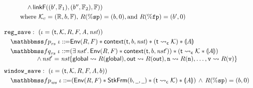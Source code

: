 \begin{figure}[!t]
\[\begin{array}{l}
\begin{array}{lcl}
                    & & \quad
                    \, \land \, 
                    \linkF((\block', \hWstk_1), (\block'', \hWstk_2), \hWstk)
                ) \\
                \\[-9pt]
                \multicolumn{3}{l}
                {
                    \qquad 
                    \text{where} \ 
                    \hthrdlocalst_c = (\hRfile, \block, \hWstk), \, 
                    \RFile(\spreg) = (\block, 0), \text{and } 
                    \RFile(\fpreg) = (\block', 0)
                }
            \end{array} 
            \\
            \\
            \texttt{reg\_save}: \ (\lgvl = (\thrdid, \hthrdlocalst, \RFile, \Wstack, 
            \primcom, \nst)) \\
            \\[-9pt]
            \quad 
            \relspecpre_{\textit{rs}} \ \lgvl \define 
            \Env{\RFile, \Wstack} \sepstar 
            \context{\thrdid, \block, \nst} \sepstar 
            (\astCurCont{\thrdid}{\hthrdlocalst}) \sepstar \safePrimAst{\primcom} \\
            \\[-9pt]
            \quad
            \relspecpost_{\textit{rs}} \ \lgvl \define 
            (\exists \, \nst'. \, \Env{\RFile, \Wstack} \sepstar
            \relcontext{\thrdid}{\block}{\nst'}) \sepstar 
            (\astCurCont{\thrdid}{\hthrdlocalst} \sepstar \safePrimAst{\primcom}) \\
            \hspace*{5em}
            \, \land \, 
            \nst' = \nst\{ \globalRN \rightsquigarrow \RFile(\globalRN), 
                \outRN \rightsquigarrow \RFile(\outRN), 
                \regn \rightsquigarrow \RFile(\regn), \dots, 
                \regv \rightsquigarrow \RFile(\regv) \}  \\
            \\[-5pt]
            \texttt{window\_save}: \ (\lgvl = (\thrdid, \hthrdlocalst, \RFile, 
                \Wstack, \primcom, \block)) \\
            \\[-9pt]
            \quad
            \relspecpre_{\textit{ws}} \ \lgvl \define 
            (\Env{\RFile, \Wstack} \sepstar \RelStkFm{\block}{\notCare}{\notCare}
            \sepstar (\astCurCont{\thrdid}{\hthrdlocalst}) \sepstar 
            \safePrimAst{\primcom}) \, \land \, \RFile(\spreg) = (\block, 0) \\

\end{array}\]
\end{figure}
